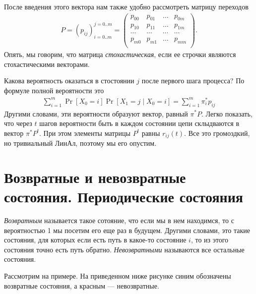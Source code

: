 \documentclass[12pt]{article}
\begin{document}
После введения этого вектора нам также удобно рассмотреть матрицу переходов
\begin{align*}
  P = (p_{ij})_{i = 0..m}^{j = 0..m} = \begin{pmatrix}
    p_{00} & p_{01} & \dots & p_{0m}\\
    p_{10} & p_{11} & \dots & p_{1m}\\
    \cdots & \cdots & \cdots & \cdots \\
    p_{m0} & p_{m1} & \dots & p_{mm}\\
    \end{pmatrix}.
\end{align*}
Опять, мы говорим, что матрица \emph{стохастическая}, если ее строчки являются стохастическими векторами.

Какова вероятность оказаться в стостоянии $j$ после первого шага процесса? По формуле полной вероятности это
\begin{align*}
  \sum_{i = 1}^m \Pr[X_0 = i] \Pr[X_1 = j \mid X_0 = i] = \sum_{i = 1}^m \pi^*_i p_{ij}
\end{align*}
Другими словами, эти вероятности образуют вектор, равный $\pi^* P$. Легко показать, что через $t$ шагов вероятности быть в каждом состоянии цепи склыдваются в вектор $\pi^* P^t$. При этом элементы матрицы $P^t$ равны $r_{ij}(t)$. Все это громоздкий, но тривиальный ЛинАл, поэтому мы его опустим.

\section{Возвратные и невозвратные состояния. Периодические состояния}

\emph{Возвратным} называется такое сотояние, что если мы в нем находимся, то с вероятностью 1 мы посетим его еще раз в будущем. Другими словами, это такие состояния, для которых если есть путь в какое-то состояние $i$, то из этого состояния точно есть путь обратно. \emph{Невозвратными} называются все остальные состояния.

Рассмотрим на примере. На приведенном ниже рисунке синим обозначены возвратные состояния, а красным --- невозвратные.
\end{document}
